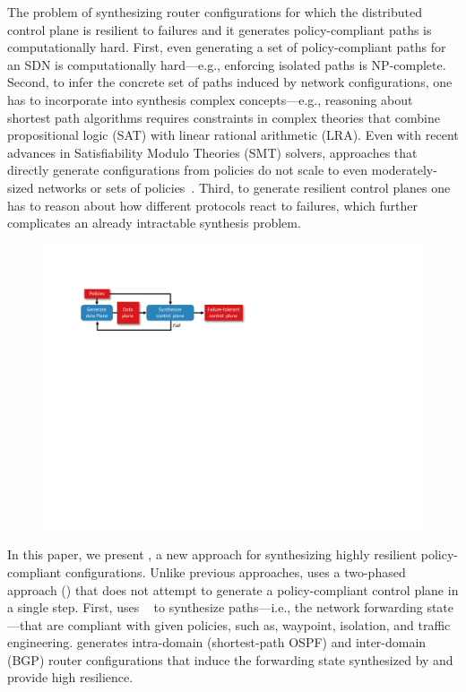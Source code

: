 The problem of synthesizing router configurations
for which the distributed control plane is
resilient to failures and it
generates policy-compliant paths 
is computationally hard. 
First, even generating a set of policy-compliant 
paths for an SDN  is 
computationally hard---e.g., enforcing isolated
paths is NP-complete. 
Second, to infer the concrete
set of paths induced by network configurations, 
one has to incorporate
into synthesis
complex concepts---e.g., reasoning about shortest path algorithms
requires constraints in complex
theories that combine propositional logic (SAT) 
with linear rational
arithmetic (LRA). Even with recent 
advances in Satisfiability Modulo Theories
(SMT) solvers, 
approaches that directly generate configurations  from policies
do not scale to
even moderately-sized networks or 
sets of policies~\cite{synet}.
Third, to generate resilient control planes one has to reason
about how different protocols react to failures, 
which further complicates an already intractable synthesis
problem. 

\begin{figure}
	\includegraphics[width=\linewidth]{figures/architecture.pdf}
	\label{fig:architecture}
\end{figure}

In this paper, we present \name, a new approach for synthesizing
highly resilient policy-compliant configurations.
Unlike previous approaches, \name uses a two-phased approach 
() 
that does not attempt to generate 
a policy-compliant control plane in a single step.
First, \name 
uses \genesis~\cite{genesis}
to synthesize paths---i.e., the network forwarding state---that are compliant
with given policies, such as, waypoint, isolation,
and traffic engineering.
\name generates 
intra-domain (shortest-path OSPF) and inter-domain (BGP) router configurations
that induce the forwarding
state synthesized by \genesis and provide high resilience. 

